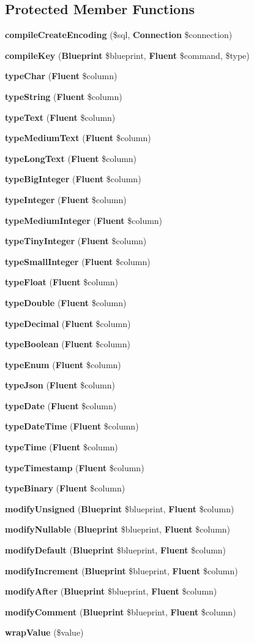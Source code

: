 \subsection*{Protected Member Functions}
\begin{DoxyCompactItemize}
\item 
{\bf compile\+Create\+Encoding} (\$sql, {\bf Connection} \$connection)
\item 
{\bf compile\+Key} ({\bf Blueprint} \$blueprint, {\bf Fluent} \$command, \$type)
\item 
{\bf type\+Char} ({\bf Fluent} \$column)
\item 
{\bf type\+String} ({\bf Fluent} \$column)
\item 
{\bf type\+Text} ({\bf Fluent} \$column)
\item 
{\bf type\+Medium\+Text} ({\bf Fluent} \$column)
\item 
{\bf type\+Long\+Text} ({\bf Fluent} \$column)
\item 
{\bf type\+Big\+Integer} ({\bf Fluent} \$column)
\item 
{\bf type\+Integer} ({\bf Fluent} \$column)
\item 
{\bf type\+Medium\+Integer} ({\bf Fluent} \$column)
\item 
{\bf type\+Tiny\+Integer} ({\bf Fluent} \$column)
\item 
{\bf type\+Small\+Integer} ({\bf Fluent} \$column)
\item 
{\bf type\+Float} ({\bf Fluent} \$column)
\item 
{\bf type\+Double} ({\bf Fluent} \$column)
\item 
{\bf type\+Decimal} ({\bf Fluent} \$column)
\item 
{\bf type\+Boolean} ({\bf Fluent} \$column)
\item 
{\bf type\+Enum} ({\bf Fluent} \$column)
\item 
{\bf type\+Json} ({\bf Fluent} \$column)
\item 
{\bf type\+Date} ({\bf Fluent} \$column)
\item 
{\bf type\+Date\+Time} ({\bf Fluent} \$column)
\item 
{\bf type\+Time} ({\bf Fluent} \$column)
\item 
{\bf type\+Timestamp} ({\bf Fluent} \$column)
\item 
{\bf type\+Binary} ({\bf Fluent} \$column)
\item 
{\bf modify\+Unsigned} ({\bf Blueprint} \$blueprint, {\bf Fluent} \$column)
\item 
{\bf modify\+Nullable} ({\bf Blueprint} \$blueprint, {\bf Fluent} \$column)
\item 
{\bf modify\+Default} ({\bf Blueprint} \$blueprint, {\bf Fluent} \$column)
\item 
{\bf modify\+Increment} ({\bf Blueprint} \$blueprint, {\bf Fluent} \$column)
\item 
{\bf modify\+After} ({\bf Blueprint} \$blueprint, {\bf Fluent} \$column)
\item 
{\bf modify\+Comment} ({\bf Blueprint} \$blueprint, {\bf Fluent} \$column)
\item 
{\bf wrap\+Value} (\$value)
\end{DoxyCompactItemize}
